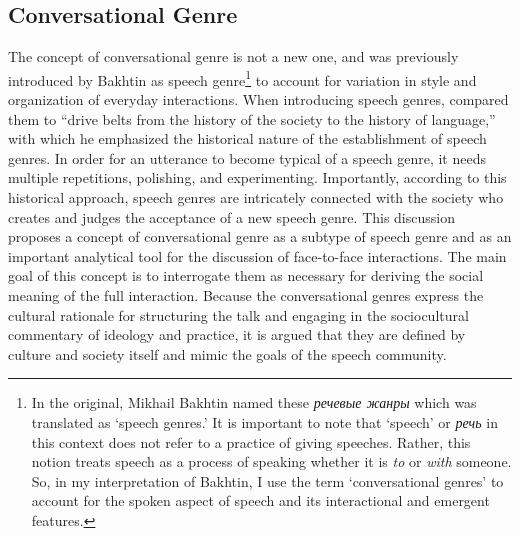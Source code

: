 \documentclass[12pt, draft]{article}
\begin{document}
\subsection{Conversational Genre}
The concept of conversational genre is not a new one, and was previously introduced by Bakhtin as speech genre\footnote{In the original, Mikhail Bakhtin named these \foreignlanguage{russian}{\textit{речевые жанры}} which was translated as `speech genres.' It is important to note that `speech' or \foreignlanguage{russian}{\textit{речь}} in this context does not refer to a  practice of giving speeches. Rather, this notion treats speech as a process of speaking whether it is \textit{to} or \textit{with} someone. So, in my interpretation of Bakhtin, I use the term `conversational genres' to account for the spoken aspect of speech and its interactional and emergent features.} to account for variation in style and organization of everyday interactions. When introducing speech genres, \textcite[p. 65]{bakhtin1986} compared them to ``drive belts from the history of the society to the history of language,'' with which he emphasized the historical nature of the establishment of speech genres. In order for an utterance to become typical of a speech genre, it needs multiple repetitions, polishing, and experimenting. Importantly, according to this historical approach, speech genres are intricately connected with the society who creates and judges the acceptance of a new speech genre. This discussion proposes a concept of conversational genre as a subtype of speech genre and as an important analytical tool for the discussion of face-to-face interactions. The main goal of this concept is to interrogate them as necessary for deriving the social meaning of the full interaction. Because the conversational genres express the cultural rationale for structuring the talk and engaging in the sociocultural commentary of ideology and practice, it is argued that they are defined by culture and society itself and mimic the goals of the speech community. 
\end{document}
